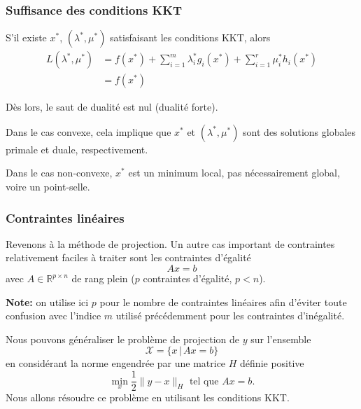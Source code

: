 \documentclass[usepdftitle=false,aspectratio=169]{beamer}
\def\red{\color{red}}
\def\cL{\mathcal{L}}
\def\cX{\mathcal{X}}
\def\RR{\mathbb{R}}
\begin{document}
\begin{frame}
	\frametitle{Suffisance des conditions KKT}
	
	S'il existe $x^*$, $(\lambda^*, \mu^*)$ satisfaisant les conditions KKT, alors
	\begin{align*}
	L(\lambda^*, \mu^*) &= f(x^*) + \sum_{i = 1}^m \lambda_i^* g_i(x^*) + \sum_{i = 1}^r \mu_i^* h_i(x^*) \\
	&= f(x^*)
	\end{align*}
	
	Dès lors, le saut de dualité est nul ({\red dualité forte}).
	
	\mbox{}
	
	Dans le cas convexe, cela implique que 	$x^*$ et $(\lambda^*, \mu^*)$ sont des solutions globales primale et duale, respectivement.

	\mbox{}

	Dans le cas non-convexe, $x^*$ est un minimum local, pas nécessairement global, voire un point-selle.
	
	
\end{frame}

\begin{frame}
	\frametitle{Contraintes linéaires}
	
	Revenons à la méthode de projection.
	Un autre cas important de contraintes relativement faciles à traiter sont les contraintes d'égalité
	$$
	Ax = b
	$$
	avec $A \in \RR^{p \times n}$ de rang plein ($p$ contraintes d'égalité, $p < n$).

	\medskip
	\textbf{Note:} on utilise ici $p$ pour le nombre de contraintes linéaires afin d'éviter toute confusion avec l'indice $m$ utilisé précédemment pour les contraintes d'inégalité.

	\medskip
	Nous pouvons généraliser le problème de projection de $y$ sur l'ensemble
	$$
	\cX = \lbrace x \,|\, Ax = b \rbrace
	$$
	en considérant la norme engendrée par une matrice $H$ définie positive
	$$
	\min_x \frac{1}{2} \| y - x \|_H \mbox{ tel que } Ax = b.
	$$
	Nous allons résoudre ce problème en utilisant les conditions KKT.
	
\end{frame}
\end{document}
